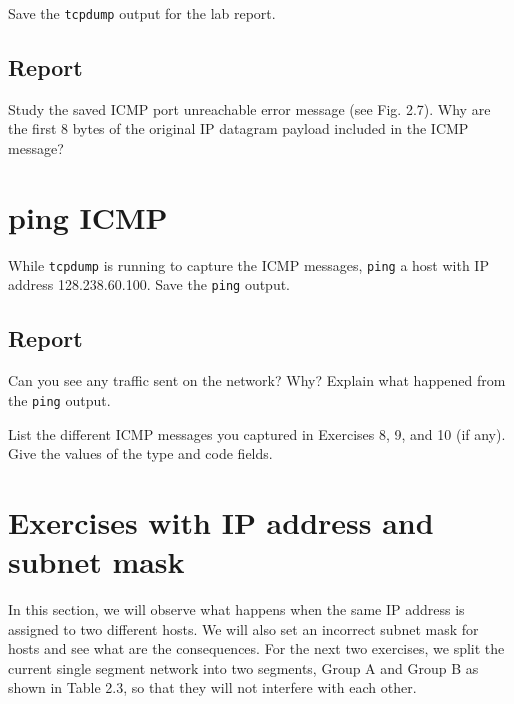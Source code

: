 \documentclass{../UTNetLab}
\begin{document}
    Save the \lstinline{tcpdump} output for the lab report.

    \subsection*{Report}
    Study the saved ICMP port unreachable error message (see Fig. 2.7).
    Why are the first 8 bytes of the original IP datagram payload included in the ICMP message?

\section{ping ICMP}
    While \lstinline{tcpdump} is running to capture the ICMP messages, \lstinline{ping} a host with IP address 128.238.60.100. Save the \lstinline{ping} output.
    
    \subsection*{Report}
    Can you see any traffic sent on the network? Why? Explain what happened from the \lstinline{ping} output.

    List the different ICMP messages you captured in Exercises 8, 9, and 10 (if any). Give the values of the type and code fields.

\section*{Exercises with IP address and subnet mask}
    In this section, we will observe what happens when the same IP address is assigned to two different hosts.
    We will also set an incorrect subnet mask for hosts and see what are the consequences.
    For the next two exercises, we split the current single segment network into two segments, Group A and Group B as shown in Table 2.3, so that they will not interfere with each other.
\end{document}
